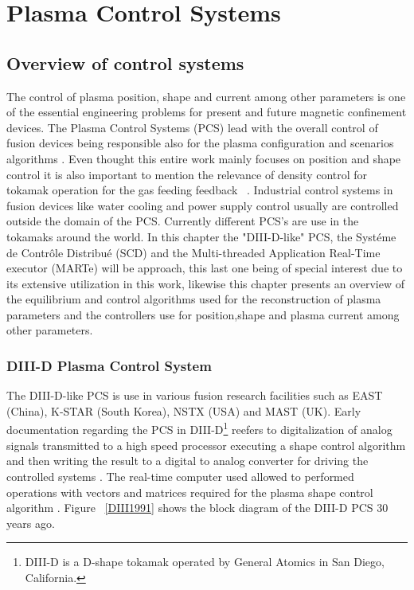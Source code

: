 \chapter{Plasma Control Systems}

\section{Overview of control systems}
The control of  plasma position, shape and current among other parameters is one of the essential engineering problems for present and future magnetic confinement devices. The Plasma Control Systems (PCS) lead with the overall control of  fusion devices being responsible also for the  plasma configuration and scenarios algorithms \cite[Chapter~8]{PCS_2018}. Even thought this entire work mainly focuses on position and shape control it is also important to mention the relevance of density control for tokamak operation for the gas feeding feedback ~\cite{densityControl}. Industrial control systems in fusion devices like water cooling and power supply control usually are controlled outside the domain of the PCS. Currently different PCS's are use in the tokamaks around the world. In this chapter the "DIII-D-like" PCS, the Syst\'eme de Contr\^ole Distribu\'e (SCD) and the Multi-threaded Application Real-Time executor (MARTe) will be approach, this last one being of special interest due to its extensive utilization in this work, likewise this chapter presents an overview of the equilibrium and control algorithms used for the reconstruction of plasma parameters and the controllers use for position,shape and plasma current among other parameters. 

\subsection{DIII-D Plasma Control System}  

The DIII-D-like PCS is use in various fusion research facilities such as EAST (China), K-STAR (South Korea), NSTX (USA) and MAST (UK). Early documentation regarding the PCS in DIII-D\footnote{DIII-D is a D-shape tokamak operated by General Atomics in San Diego, California. } reefers to digitalization of analog signals transmitted to a high speed processor executing a shape control algorithm and then writing the result to a digital to analog converter for driving the controlled systems . The real-time computer used allowed to performed operations with vectors and matrices required for the plasma shape control algorithm \cite{DIIDcontrol}. Figure ~\ref{DIII1991} shows the block diagram of the DIII-D PCS 30 years ago.
\smallskip

